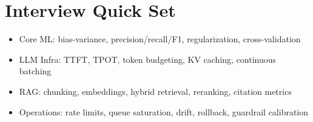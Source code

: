 \section*{Interview Quick Set}
\begin{itemize}
  \item Core ML: bias-variance, precision/recall/F1, regularization, cross-validation
  \item LLM Infra: TTFT, TPOT, token budgeting, KV caching, continuous batching
  \item RAG: chunking, embeddings, hybrid retrieval, reranking, citation metrics
  \item Operations: rate limits, queue saturation, drift, rollback, guardrail calibration
\end{itemize}
